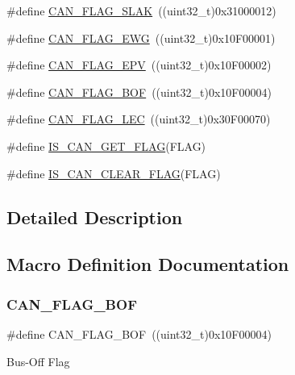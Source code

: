 \begin{DoxyCompactItemize}
\#define \mbox{\hyperlink{group___c_a_n__flags_gad087b5025a3d5ead2c32b06663821cf4}{C\+A\+N\+\_\+\+F\+L\+A\+G\+\_\+\+S\+L\+AK}}~((uint32\+\_\+t)0x31000012)
\item 
\#define \mbox{\hyperlink{group___c_a_n__flags_gae8906ba9c4031866c5096418ffa9bf71}{C\+A\+N\+\_\+\+F\+L\+A\+G\+\_\+\+E\+WG}}~((uint32\+\_\+t)0x10\+F00001)
\item 
\#define \mbox{\hyperlink{group___c_a_n__flags_ga61954e54995f638ed78281ad2b0cf43a}{C\+A\+N\+\_\+\+F\+L\+A\+G\+\_\+\+E\+PV}}~((uint32\+\_\+t)0x10\+F00002)
\item 
\#define \mbox{\hyperlink{group___c_a_n__flags_ga65f20612d0bf1692003882c0cdbadb1c}{C\+A\+N\+\_\+\+F\+L\+A\+G\+\_\+\+B\+OF}}~((uint32\+\_\+t)0x10\+F00004)
\item 
\#define \mbox{\hyperlink{group___c_a_n__flags_ga73a774fa4d391aec0ea6552bf9372917}{C\+A\+N\+\_\+\+F\+L\+A\+G\+\_\+\+L\+EC}}~((uint32\+\_\+t)0x30\+F00070)
\item 
\#define \mbox{\hyperlink{group___c_a_n__flags_ga38d33d1762ed3a331d214cdb3249866e}{I\+S\+\_\+\+C\+A\+N\+\_\+\+G\+E\+T\+\_\+\+F\+L\+AG}}(F\+L\+AG)
\item 
\#define \mbox{\hyperlink{group___c_a_n__flags_gac46f5fb953efb6163cf3b2e33a514d0c}{I\+S\+\_\+\+C\+A\+N\+\_\+\+C\+L\+E\+A\+R\+\_\+\+F\+L\+AG}}(F\+L\+AG)
\end{DoxyCompactItemize}


\subsection{Detailed Description}


\subsection{Macro Definition Documentation}
\mbox{\label{group___c_a_n__flags_ga65f20612d0bf1692003882c0cdbadb1c}} 
\subsubsection{\texorpdfstring{CAN\_FLAG\_BOF}{CAN\_FLAG\_BOF}}
{\footnotesize\ttfamily \#define C\+A\+N\+\_\+\+F\+L\+A\+G\+\_\+\+B\+OF~((uint32\+\_\+t)0x10\+F00004)}

Bus-\/\+Off Flag \mbox{\label{group___c_a_n__flags_ga61954e54995f638ed78281ad2b0cf43a}} 
